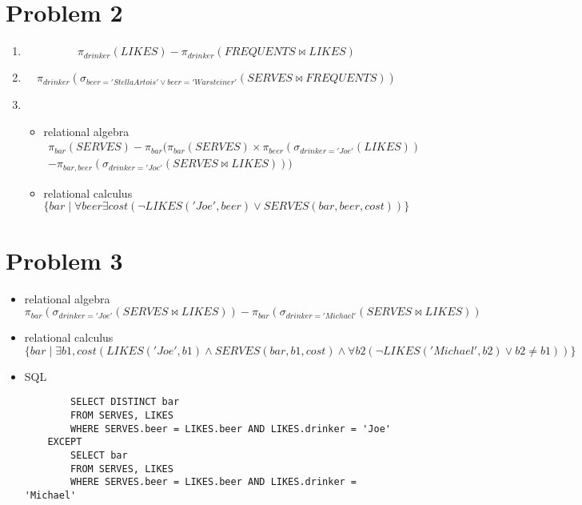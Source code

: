 \documentclass[a4paper]{article}
\begin{document}
\section*{Problem 2}
\begin{enumerate}
    \item \mbox{}
        \begin{equation*}
        \pi_{drinker}(LIKES) - \pi_{drinker}(FREQUENTS \bowtie LIKES)
        \end{equation*}

    \item \mbox{}
        \begin{equation*}
        \pi_{drinker}(\sigma_{beer='Stella Artois' \lor beer='Warsteiner'}(SERVES \bowtie FREQUENTS))
        \end{equation*}

    \item \mbox{}
    \begin{itemize}
        \item relational algebra
        \begin{gather*}
        \pi_{bar}(SERVES)-\pi_{bar}(\pi_{bar}(SERVES) \times \pi_{beer}(\sigma_{drinker='Joe'}(LIKES)) \\
        - \pi_{bar, beer}(\sigma_{drinker='Joe'}(SERVES \bowtie LIKES)))
        \end{gather*}
        \item relational calculus
        \begin{equation*}
        \{ bar \mid \forall beer \exists cost (\neg LIKES('Joe', beer) \lor SERVES(bar, beer, cost)) \}
        \end{equation*}
    \end{itemize}
\end{enumerate}

\section*{Problem 3}
\begin{itemize}
        \item relational algebra
        \begin{equation*}
        \pi_{bar}(\sigma_{drinker='Joe'}(SERVES \bowtie LIKES)) - \pi_{bar}(\sigma_{drinker='Michael'}(SERVES \bowtie LIKES))
        \end{equation*}
        \item relational calculus
        \begin{equation*}
        \{ bar \mid \exists b1, cost (LIKES('Joe', b1) \land SERVES(bar, b1, cost) \land \forall b2 (\neg LIKES('Michael', b2) \lor b2 \not= b1)) \}
        \end{equation*}
        \item SQL
        \begin{lstlisting}
        SELECT DISTINCT bar
        FROM SERVES, LIKES
        WHERE SERVES.beer = LIKES.beer AND LIKES.drinker = 'Joe'
    EXCEPT
        SELECT bar
        FROM SERVES, LIKES
        WHERE SERVES.beer = LIKES.beer AND LIKES.drinker = 'Michael'
        \end{lstlisting}
\end{itemize}
\end{document}
